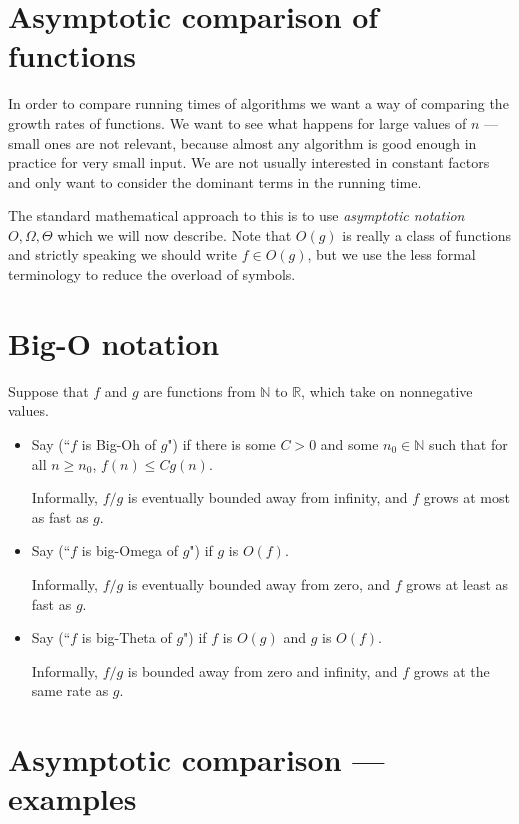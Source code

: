 \section{Asymptotic comparison of functions}
In order to compare running times of algorithms we want a way of comparing
the growth rates of functions. We want to see what happens for large values of $n$ --- small ones are not
 relevant, because almost any algorithm is good enough in practice for very small input. 
 We are not usually interested in constant factors and only want to consider the 
dominant terms in the running time.

The standard mathematical approach to this is to use \emph{asymptotic notation}
$O, \Omega, \Theta$ which we will now describe. Note that $O(g)$ is really a class of functions and strictly speaking 
we should write $f\in O(g)$, but we use the less formal terminology to reduce the overload of symbols.

\section{Big-O notation}
\begin{Definition}

Suppose that $f$ and $g$ are functions from $\mathbb{N}$ to $\mathbb{R}$, 
which take on nonnegative values. 
\begin{itemize}
\item Say  (``$f$ is Big-Oh of $g$") if there is
some $C > 0$ and some $n_0 \in \mathbb{N}$ such that for all $n \geq
n_0$, $f(n) \leq C g(n)$. 

Informally, $f/g$ is eventually bounded away from infinity, and $f$ grows at most as fast as $g$.

\item Say  (``$f$ is big-Omega of $g$") if $g$ is
$O(f)$. 

Informally, $f/g$ is eventually bounded away from zero, and $f$ grows at least as fast as $g$.
\item Say  (``$f$ is big-Theta of $g$") if $f$ is 
$O(g)$ and $g$ is $O(f)$. 

Informally, $f/g$ is bounded away from zero and infinity, and $f$ grows at the same rate as $g$.
\end{itemize}
\end{Definition}



\section{Asymptotic comparison --- examples}

